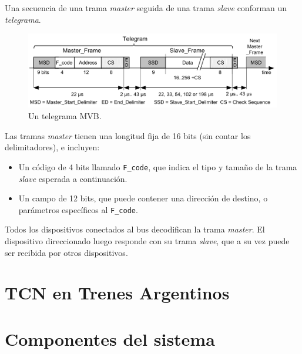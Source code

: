 Una secuencia de una trama \textit{master} seguida de una trama \textit{slave} conforman un \textit{telegrama}.

\begin{figure}[htbp]
	\centering
	\includegraphics[width=1\textwidth]{./Figures/telegrama.png}
	\caption[Un telegrama MVB]{Un telegrama MVB.
        \\ }
\end{figure}

Las tramas \textit{master} tienen una longitud fija de 16 bits (sin contar los delimitadores), e incluyen:

\begin{itemize}
\item Un código de 4 bits llamado \texttt{F\_code}, que indica el tipo y tamaño de la trama \textit{slave} esperada a continuación.
\item Un campo de 12 bits, que puede contener una dirección de destino, o parámetros específicos al \texttt{F\_code}.
\end{itemize}

Todos los dispositivos conectados al bus decodifican la trama \textit{master}. El dispositivo direccionado luego responde con su trama \textit{slave}, que a su vez puede ser recibida por otros dispositivos.

\section{TCN en Trenes Argentinos}

\section{Componentes del sistema}
